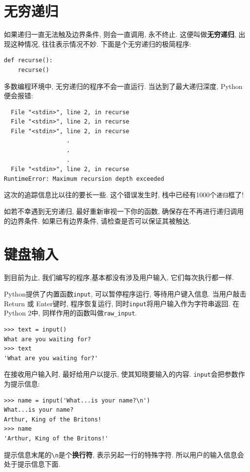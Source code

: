 \documentclass[10pt]{book}
\begin{document}
\section{无穷递归}

如果递归一直无法触及边界条件, 则会一直调用, 永不终止. 
这便叫做{\bf 无穷递归}, 出现这种情况, 往往表示情况不妙. 
下面是个无穷递归的极简程序:

\begin{verbatim}
def recurse():
    recurse()
\end{verbatim}
%
多数编程环境中, 无穷递归的程序不会一直运行. 
当达到了最大递归深度, Python便会报错:

\begin{verbatim}
  File "<stdin>", line 2, in recurse
  File "<stdin>", line 2, in recurse
  File "<stdin>", line 2, in recurse
                  .   
                  .
                  .
  File "<stdin>", line 2, in recurse
RuntimeError: Maximum recursion depth exceeded
\end{verbatim}
%
这次的追踪信息比以往的要长一些. 这个错误发生时, 栈中已经有1000个{\tt 递归}框了!

如若不幸遇到无穷递归, 最好重新审视一下你的函数, 确保存在不再进行递归调用的边界条件. 
如果已有边界条件, 请检查是否可以保证其被触达. 


\section{键盘输入}

到目前为止, 我们编写的程序,基本都没有涉及用户输入, 它们每次执行都一样. 

Python提供了内置函数{\tt input}, 可以暂停程序运行, 等待用户键入信息. 
当用户敲击{\sf  Return} 或 {\sf Enter}键时, 程序恢复运行, 
同时\verb"input"将用户输入作为字符串返回. 
在Python 2中, 同样作用的函数叫做\verb"raw_input".

\begin{verbatim}
>>> text = input()
What are you waiting for?
>>> text
'What are you waiting for?'
\end{verbatim}
%
在接收用户输入时, 最好给用户以提示, 使其知晓要输入的内容. 
\verb"input"会把参数作为提示信息:

\begin{verbatim}
>>> name = input('What...is your name?\n')
What...is your name?
Arthur, King of the Britons!
>>> name
'Arthur, King of the Britons!'
\end{verbatim}
%
提示信息末尾的\verb"\n"是个{\bf 换行符}, 表示另起一行的特殊字符. 
所以用户的输入信息会处于提示信息下面.  
\end{document}
